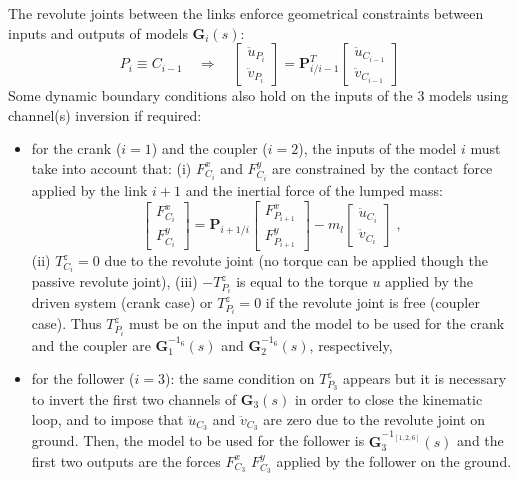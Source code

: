 \documentclass[smallcondensed]{svjour3}     %
\begin{document}
The revolute joints between the links enforce geometrical constraints between inputs and outputs of models $\mathbf{G}_i(s)$:
\[
P_{i}\equiv C_{i-1}\quad \Rightarrow \quad  \left[\begin{array}{c}\ddot{u}_{P_i} \\ \ddot{v}_{P_i}\end{array}\right]=\mathbf{P}_{i/i-1}^T\left[\begin{array}{c}\ddot{u}_{C_{i-1}} \\ \ddot{v}_{C_{i-1}}\end{array}\right]
\]
Some dynamic boundary conditions also hold on the inputs of the 3 models using channel(s) inversion if required:
\begin{itemize}
\item for the crank ($i=1$) and the coupler ($i=2$), the inputs of the model $i$ must take into account that: (i) $F^x_{C_i}$ and $F^y_{C_i}$ are constrained by the contact force applied by the link $i+1$ and the inertial force of the lumped mass:\begin{equation}
\left[\begin{array}{c}F^x_{C_{i}} \\ F^y_{C_{i}}\end{array}\right]=\mathbf{P}_{i+1/i}\left[\begin{array}{c} F^x_{P_{i+1}} \\ F^y_{P_{i+1}}\end{array}\right]-m_l\left[\begin{array}{c}\ddot{u}_{C_{i}} \\ \ddot{v}_{C_{i}}\end{array}\right]\;,
\end{equation} (ii) $T^z_{C_i}=0$ due to the revolute joint (no torque can be applied though the passive revolute joint),  (iii) $-T^z_{P_i}$ is equal to the torque $u$ applied by the driven system (crank case) or $T^z_{P_i}=0$ if the revolute joint is free (coupler case). Thus $T^z_{P_i}$ must be on the input and the model to be used for the crank and the coupler are $\mathbf{G}_1^{-1_6}(s)$ and $\mathbf{G}_2^{-1_6}(s)$, respectively,
\item for the follower ($i=3$): the same condition on $T^z_{P_3}$ appears but it is necessary to invert the first two channels of $\mathbf{G}_3(s)$ in order to close the kinematic loop, and to impose that $\ddot{u}_{C_3}$ and $\ddot{v}_{C_3}$ are zero due to the revolute joint on ground. Then, the model to be used for the follower is $\mathbf{G}_3^{-1_{[1,2,6]}}(s)$ and the first two outputs are the forces $F^x_{C_3}$ $F^y_{C_3}$ applied by the follower on the ground.
\end{itemize}
\end{document}
